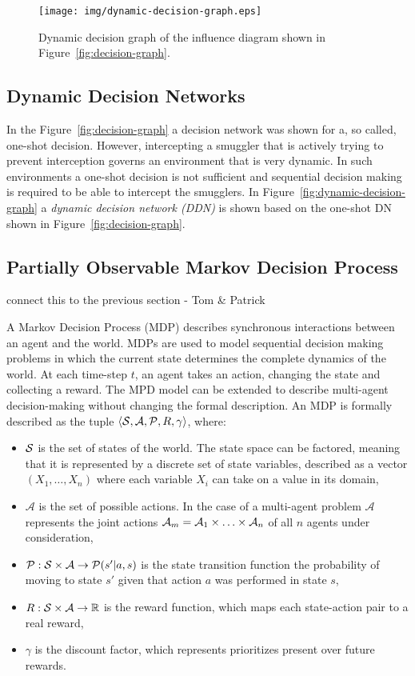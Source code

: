 \documentclass[conference]{IEEEtran}
\begin{document}
\begin{figure}[!t]
\begin{center}
 \texttt{[image: img/dynamic-decision-graph.eps]}
 \caption{Dynamic decision graph of the influence diagram shown in Figure~\ref{fig:decision-graph}.}\label{fig:ddn} 
\end{center}
\end{figure}


\subsection{Dynamic Decision Networks}

In the Figure~\ref{fig:decision-graph} a decision network was shown for a, so called, one-shot decision. However, intercepting a smuggler that is actively trying to prevent interception governs an environment that is very dynamic. In such environments a one-shot decision is not sufficient and sequential decision making is required to be able to intercept the smugglers. In Figure~\ref{fig:dynamic-decision-graph} a {\em dynamic decision network (DDN)} is shown based on the one-shot DN shown in Figure~\ref{fig:decision-graph}.

\subsection{Partially Observable Markov Decision Process}
\label{sub:pomdp}
{\red connect this to the previous section - Tom \& Patrick}

A Markov Decision Process (MDP) \cite{bellman1957dynamic,mdp} describes synchronous interactions between an agent and the world. MDPs are used to model sequential decision making problems in which the current state determines the complete dynamics of the world. At each time-step $t$, an agent takes an action, changing the state and collecting a reward. The MPD model can be extended to describe multi-agent decision-making without changing the formal description. An MDP is formally described as the tuple $\langle\S,\mathcal{A},\P,R,\gamma\rangle$, where:

\begin{itemize}
\item $\S$ is the set of states of the world. The state space can be factored, meaning that it is represented by a discrete set of state variables, described as a vector $\left(X_1,\ldots,X_n\right)$ where each variable $X_i$ can take on a value in its domain,
\item $\mathcal{A}$ is the set of possible actions. In the case of a multi-agent problem $\mathcal{A}$ represents the joint actions $\A_{m} = \A_1\times\ldots\times\A_n$ of all $n$ agents under consideration,
\item $\P:\S\times\mathcal{A}\to\P(s'|a,s)$ is the state transition function \ie the probability of moving to state $s'$ given that action $a$ was performed in state $s$,
\item $R:\S\times\mathcal{A}\to\mathbb{R}$ is the reward function, which maps each state-action pair to a real reward,
\item $\gamma$ is the discount factor, which represents prioritizes present over future rewards.
\end{itemize}
\end{document}
